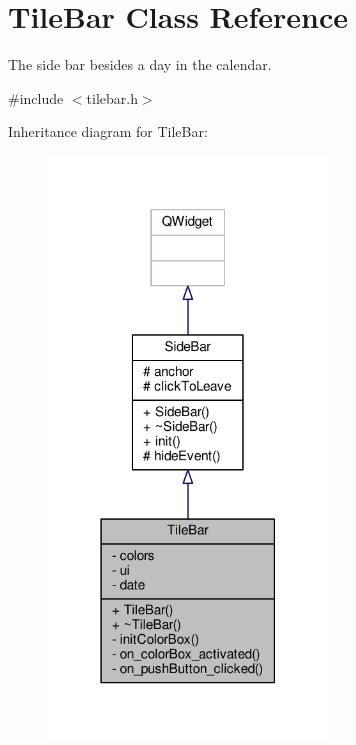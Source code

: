 \hypertarget{classTileBar}{}\section{Tile\+Bar Class Reference}
\label{classTileBar}


The side bar besides a day in the calendar.  




{\ttfamily \#include $<$tilebar.\+h$>$}



Inheritance diagram for Tile\+Bar\+:
\nopagebreak
\begin{figure}[H]
\begin{center}
\leavevmode
\includegraphics[width=210pt]{classTileBar__inherit__graph}
\end{center}
\end{figure}


